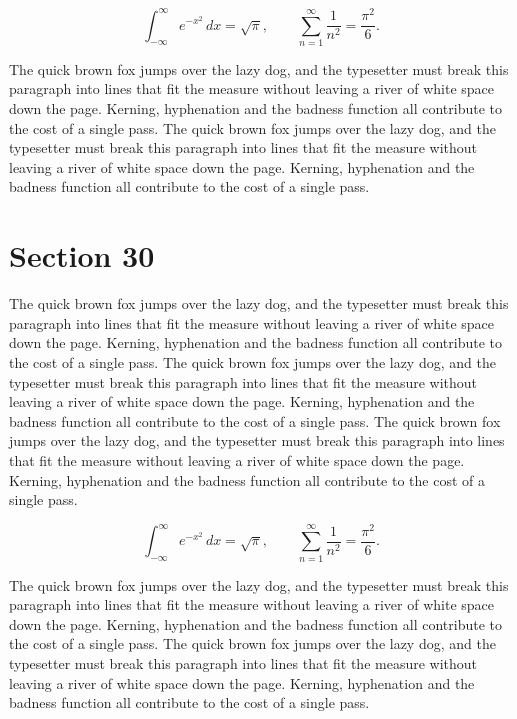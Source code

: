 \documentclass{article}
\begin{document}
\begin{equation}
\int_{-\infty}^{\infty} e^{-x^{2}}\,dx = \sqrt{\pi}, \qquad
\sum_{n=1}^{\infty} \frac{1}{n^{2}} = \frac{\pi^{2}}{6}.
\end{equation}

The quick brown fox jumps over the lazy dog, and the typesetter must break this paragraph into lines that fit the measure without leaving a river of white space down the page. Kerning, hyphenation and the badness function all contribute to the cost of a single pass. The quick brown fox jumps over the lazy dog, and the typesetter must break this paragraph into lines that fit the measure without leaving a river of white space down the page. Kerning, hyphenation and the badness function all contribute to the cost of a single pass. 
\section{Section 30}
The quick brown fox jumps over the lazy dog, and the typesetter must break this paragraph into lines that fit the measure without leaving a river of white space down the page. Kerning, hyphenation and the badness function all contribute to the cost of a single pass. The quick brown fox jumps over the lazy dog, and the typesetter must break this paragraph into lines that fit the measure without leaving a river of white space down the page. Kerning, hyphenation and the badness function all contribute to the cost of a single pass. The quick brown fox jumps over the lazy dog, and the typesetter must break this paragraph into lines that fit the measure without leaving a river of white space down the page. Kerning, hyphenation and the badness function all contribute to the cost of a single pass. 

\begin{equation}
\int_{-\infty}^{\infty} e^{-x^{2}}\,dx = \sqrt{\pi}, \qquad
\sum_{n=1}^{\infty} \frac{1}{n^{2}} = \frac{\pi^{2}}{6}.
\end{equation}

The quick brown fox jumps over the lazy dog, and the typesetter must break this paragraph into lines that fit the measure without leaving a river of white space down the page. Kerning, hyphenation and the badness function all contribute to the cost of a single pass. The quick brown fox jumps over the lazy dog, and the typesetter must break this paragraph into lines that fit the measure without leaving a river of white space down the page. Kerning, hyphenation and the badness function all contribute to the cost of a single pass. 
\end{document}
